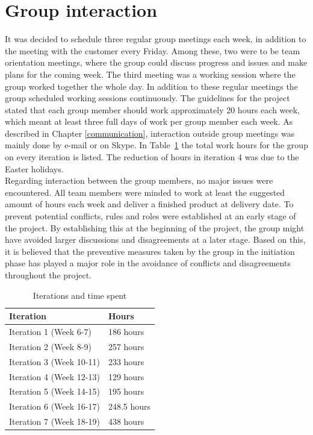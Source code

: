 \section{Group interaction}
	It was decided to schedule three regular group meetings each week, in addition to the meeting with the customer every Friday. Among these, two were to be team orientation meetings, where the group could discuss progress and issues and make plans for the coming week. The third meeting was a working session where the group worked together the whole day.
	In addition to these regular meetings the group scheduled working sessions continuously. The guidelines for the project stated that each group member should work approximately 20 hours each week, which meant at least three full days of work per group member each week. As described in Chapter \ref{communication}, interaction outside group meetings was mainly done by e-mail or on Skype. In Table~\ref{table:workhours} the total work hours for the group on every iteration is listed. The reduction of hours in iteration 4 was due to the Easter holidays. \\
	\newline
	Regarding interaction between the group members, no major issues were encountered. All team members were minded to work at least the suggested amount of hours each week and deliver a finished product at delivery date. To prevent potential conflicts, rules and roles were established at an early stage of the project. By establishing this at the beginning of the project, the group might have avoided larger discussions and disagreements at a later stage. Based on this, it is believed that the preventive measures taken by the group in the initiation phase has played a major role in the avoidance of conflicts and disagreements throughout the project.

	\begin{table}[H]
	\caption{Iterations and time spent}
	\centering
	\label{table:workhours}
	\begin{tabular}{|l|l|}
		\hline
			{\bf Iteration} & {\bf Hours}\\
		\hline
			Iteration 1 (Week 6-7) & 186 hours\\
		\hline
			Iteration 2 (Week 8-9) & 257 hours\\
		\hline
			Iteration 3 (Week 10-11) & 233 hours\\
		\hline
			Iteration 4 (Week 12-13) & 129 hours\\
		\hline
			Iteration 5 (Week 14-15) & 195 hours\\
		\hline
			Iteration 6 (Week 16-17) & 248.5 hours\\
		\hline
			Iteration 7 (Week 18-19) & 438 hours\\
		\hline
	\end{tabular}
	\end{table}

